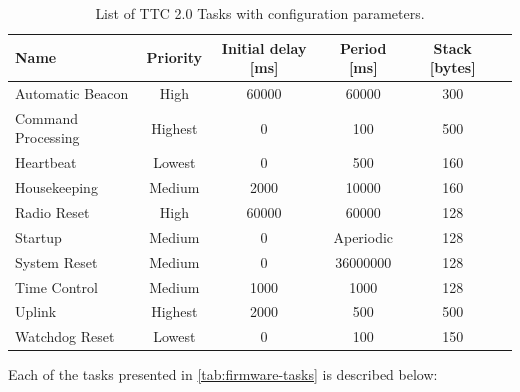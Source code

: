 \begin{table}[!ht]
    \centering

    \begin{tabular}{lccccc}
        \toprule[1.5pt]
        \textbf{Name}          & \textbf{Priority} & \textbf{Initial delay [ms]} & \textbf{Period [ms]} & \textbf{Stack [bytes]} \\
        \midrule
        Automatic Beacon       & High    & 60000 & 60000     & 300 \\
        Command Processing     & Highest & 0     & 100       & 500 \\
        Heartbeat              & Lowest  & 0     & 500       & 160 \\
        Housekeeping           & Medium  & 2000  & 10000     & 160 \\
        Radio Reset            & High    & 60000 & 60000     & 128 \\
        Startup                & Medium  & 0     & Aperiodic & 128 \\
        System Reset           & Medium  & 0     & 36000000  & 128 \\
        Time Control           & Medium  & 1000  & 1000      & 128 \\
        Uplink                 & Highest & 2000  & 500       & 500 \\
        Watchdog Reset         & Lowest  & 0     & 100       & 150 \\
        \bottomrule[1.5pt]
    \end{tabular}
    \caption{List of TTC 2.0 Tasks with configuration parameters.}
    \label{tab:firmware-tasks}
\end{table}

Each of the tasks presented in \autoref{tab:firmware-tasks} is described below:

